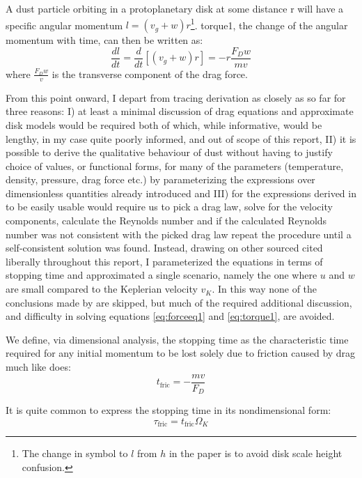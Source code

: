 \documentclass[12pt]{article}
\begin{document}
A dust particle orbiting in a protoplanetary disk at some distance r will have a specific angular momentum $l=(v_g + w)r$\footnote{The change in symbol to $l$ from $h$ in the paper is to avoid disk scale height confusion.}. torque1, the change of the angular momentum with time, can then be written as: 
\begin{equation}
    \label{eq:torque1} 
    \frac{dl}{dt} = \frac{d}{dt} \left[ (v_g+w)r \right] = -r\frac{F_D w}{mv}
\end{equation}
where $\frac{F_D w}{v}$ is the transverse component of the drag force.

From this point onward, I depart from tracing \citet{Weidenschilling77} derivation as closely as so far for three reasons: I) at least a minimal discussion of drag equations and approximate disk models would be required both of which, while informative, would be lengthy, in my case quite poorly informed, and out of scope of this report, II) it is possible to derive the qualitative behaviour of dust without having to justify choice of values, or functional forms, for many of the parameters (temperature, density, pressure, drag force etc.) by parameterizing the expressions over dimensionless quantities already introduced and III) for the expressions derived in \citet{Weidenschilling77} to be easily usable would require us to pick a drag law, solve for the velocity components, calculate the Reynolds number and if the calculated Reynolds number was not consistent with the picked drag law repeat the procedure until a self-consistent solution was found. Instead, drawing on other sourced cited liberally throughout this report, I parameterized the equations in terms of stopping time and approximated a single scenario, namely the one where $u$ and $w$ are small compared to the Keplerian velocity $v_K$. In this way none of the conclusions made by \citet{Weidenschilling77} are skipped, but much of the required additional discussion, and difficulty in solving equations \ref{eq:forceeq1} and \ref{eq:torque1}, are avoided.

 We define, via dimensional analysis, the stopping time as the characteristic time required for any initial momentum to be lost solely due to friction caused by drag much like\citet{Weidenschilling77} does:
\begin{equation}
    t_{\mathrm{fric}} = -\frac{mv}{F_D} 
\end{equation}

It is quite common to express the stopping time in its nondimensional form: 
\begin{equation}
    \label{eq:nondimfric}
    \tau_{\mathrm{fric}} = t_{\mathrm{fric}}\Omega_K
\end{equation}
\end{document}
